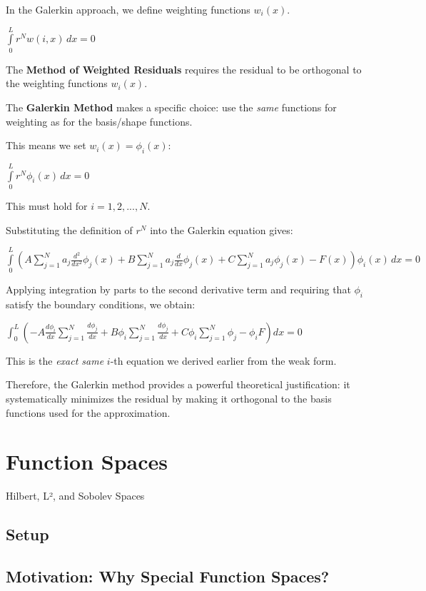 \documentclass[
  11pt,
  a4paper,
]{scrbook}
\begin{document}
In the Galerkin approach, we define weighting functions \(w_i(x)\).

$\displaystyle \int\limits_{0}^{L} r^{N} w{\left(i,x \right)}\, dx = 0$

The \textbf{Method of Weighted Residuals} requires the residual to be
orthogonal to the weighting functions \(w_i(x)\).

The \textbf{Galerkin Method} makes a specific choice: use the
\emph{same} functions for weighting as for the basis/shape functions.

This means we set \(w_i(x) = \phi_i(x)\):

$\displaystyle \int\limits_{0}^{L} r^{N} \phi_{i}(x)\, dx = 0$

This must hold for \(i = 1, 2, ..., N\).

Substituting the definition of \(r^N\) into the Galerkin equation gives:

$\displaystyle \int\limits_{0}^{L} \left(A \sum_{j=1}^{N} {a}_{j} \frac{d^{2}}{d x^{2}} \phi_{j}(x) + B \sum_{j=1}^{N} {a}_{j} \frac{d}{d x} \phi_{j}(x) + C \sum_{j=1}^{N} {a}_{j} \phi_{j}(x) - F{\left(x \right)}\right) \phi_{i}(x)\, dx = 0$

Applying integration by parts to the second derivative term and
requiring that \(\phi_i\) satisfy the boundary conditions, we obtain:

\(\int_0^L \left( -A \frac{d\phi_i}{dx} \sum_{j=1}^N\frac{d\phi_j}{dx} + B \phi_i \sum_{j=1}^N\frac{d\phi_j}{dx} + C \phi_i \sum_{j=1}^N\phi_j - \phi_i F \right) dx = 0\)

This is the \emph{exact same} \(i\)-th equation we derived earlier from
the weak form.

Therefore, the Galerkin method provides a powerful theoretical
justification: it systematically minimizes the residual by making it
orthogonal to the basis functions used for the approximation.

\chapter{Function Spaces}\label{function-spaces}

Hilbert, L², and Sobolev Spaces

\hfill\break

\section{Setup}\label{setup-2}

\section{Motivation: Why Special Function
Spaces?}\label{motivation-why-special-function-spaces}
\end{document}
